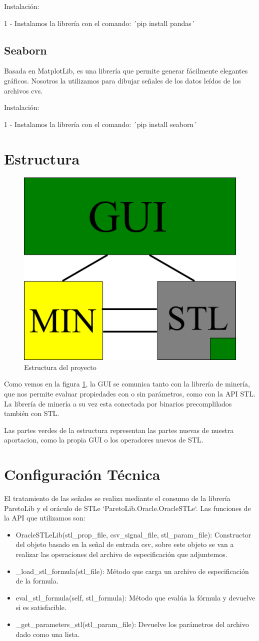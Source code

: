 Instalación: 
 
1 - Instalamos la librería con el comando: ´pip install pandas´

\subsection{Seaborn} 
Basada en MatplotLib, es una librería que permite generar fácilmente elegantes gráficos. Nosotros la utilizamos para dibujar señales de los datos leídos de los archivos cvs.
 
Instalación: 
 
1 - Instalamos la librería con el comando: ´pip install seaborn´

\section{Estructura}
\begin{figure}[htb]
\centering
  \includegraphics[width=.4\linewidth]{images/dibujo_estructura} 
\caption{Estructura del proyecto}
\label{fig:est}
\end{figure}
Como vemos en la figura \ref{fig:est}, la GUI se comunica tanto con la librería de minería, que nos permite evaluar propiedades con o sin parámetros, como con la API STL. La librería de minería a su vez esta conectada por binarios precomplilados también con STL.

Las partes verdes de la estructura representan las partes nuevas de nuestra aportacion, como la propia GUI o los operadores nuevos de STL.
 
\section{Configuración Técnica}
El tratamiento de las señales se realiza mediante el consumo de la librería ParetoLib y el oráculo de STLe `ParetoLib.Oracle.OracleSTLe`. Las funciones de la API que utilizamos son: 
\begin{itemize}
\item OracleSTLeLib(stl\_prop\_file, csv\_signal\_file, stl\_param\_file): Constructor del objeto basado en la señal de entrada csv, sobre este objeto se van a realizar las operaciones del archivo de especificación que adjuntemos. 
\item \_load\_stl\_formula(stl\_file): Método que carga un archivo de especificación de la formula. 
\item eval\_stl\_formula(self, stl\_formula): Método que evalúa la fórmula y devuelve si es satisfacible.
\item \_get\_parameters\_stl(stl\_param\_file): Devuelve los parámetros del archivo dado como una lista.
\end{itemize} 

